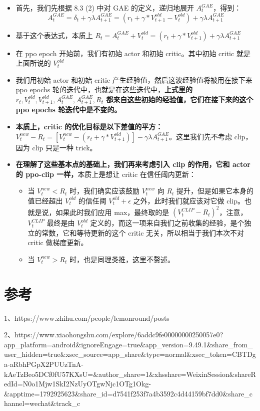 \documentclass[UTF8,fontset=fandol]{ctexart}
\begin{document}
\begin{itemize}
\item 首先，我们先根据 8.3 (2) 中对 GAE 的定义，递归地展开 \(A_t^{GAE}\)，得到：
\[
A_t^{GAE} = \delta_t + \gamma\lambda A_{t+1}^{GAE} = (r_t + \gamma * V_{t+1}^{old} - V_t^{old}) + \gamma\lambda A_{t+1}^{GAE}
\]

\item 基于这个表达式，本质上 \(R_t = A_t^{GAE} + V_t^{old} = (r_t + \gamma * V_{t+1}^{old}) + \gamma\lambda A_{t+1}^{GAE}\)

\item 在 ppo epoch 开始前，我们有初始 actor 和初始 critic。其中初始 critic 就是上面所说的 \(V_t^{old}\)

\item 我们用初始 actor 和初始 critic 产生经验值，然后这波经验值将被用在接下来 ppo epochs 轮的迭代中，也就是在这些迭代中，\textbf{上式里的 \(r_t, V_t^{old}, V_{t+1}^{old}, A_t^{GAE}, A_{t+1}^{GAE}, R_t\) 都来自这些初始的经验值，它们在接下来的这个 ppo epochs 轮迭代中是不变的。}

\item \textbf{本质上，critic 的优化目标是以下差值的平方：} \\
\(V_t^{new} - R_t = [V_t^{new} - (r_t + \gamma * V_{t+1}^{old})] - \gamma\lambda A_{t+1}^{GAE}\)。这里我们先不考虑 clip，因为 clip 只是一种 trick。
\end{itemize}

\begin{itemize}
\item \textbf{在理解了这些基本点的基础上，我们再来考虑引入 clip 的作用，它和 actor 的 ppo-clip 一样，}本质上是想让 critic 在信任阈内更新：
\begin{itemize}
\item 当 \(V_t^{new} < R_t\) 时，我们确实应该鼓励 \(V_t^{new}\) 向 \(R_t\) 提升，但是如果它本身的值已经超出 \(V_t^{old}\) 的信任阈 \(V_t^{old} + \epsilon\) 之外，此时我们就应该对它做 clip。也就是说，如果此时我们应用 max，最终取的是 \((V_t^{CLIP} - R_t)^2\)，注意，\(V_t^{CLIP}\) 最终是由 \(V_t^{old}\) 定义的，而这一项来自我们之前收集的经验，是个独立的常数，它和等待更新的这个 critic 无关，所以相当于我们本次不对 critic 做梯度更新。
\item 当 \(V_t^{new} > R_t\) 时，也是同理类推，这里不赘述。
\end{itemize}
\end{itemize}

\section{参考}
1、https://www.zhihu.com/people/lemonround/posts

2、https://www.xiaohongshu.com/explore/6addc9fe00000000250057e0?app_platform=android\&ignoreEngage=true\&app_version=9.49.1\&share_from_user_hidden=true\&xsec_source=app_share\&type=normal\&xsec_token=CBTDga-aRbhPGpX2PUUzTnA-kAeTzBeo5DCf0fU57KXsU=\&author_share=1\&xhsshare=WeixinSession\&shareRedId=N0o1Mjw1SkI2NzUyOTgwNjc1OTg1Okg-\&apptime=1792925623\&share_id=d7541f253f7a4b3592c4d44159bf7dd0\&share_channel=wechat\&track_c
\end{document}
